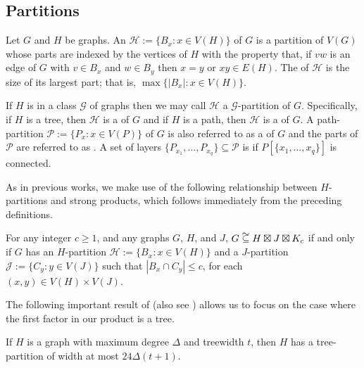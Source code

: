 \documentclass{patmorin}
\newcommand\subsetcong{\mathrel{\text{%
    \setbox0\hbox{$\subseteq$}%
    \rlap{\hbox to \wd0{\hss\hss\hss\raisebox{1.5\height}{$\sim$}\hss}}\box0
}}}
\renewcommand{\le}{\leqslant}
\renewcommand{\ge}{\geqslant}
\begin{document}
\subsection{Partitions}

Let $G$ and $H$ be graphs.  An  $\mathcal{H}:=\{B_x:x\in V(H)\}$ of $G$ is a partition of $V(G)$ whose parts are indexed by the vertices of $H$ with the property that, if $vw$ is an edge of $G$ with $v\in B_x$ and $w\in B_y$ then $x=y$ or $xy\in E(H)$.  The  of $\mathcal{H}$ is the size of its largest part; that is, $\max\{|B_x|:x\in V(H)\}$.

If $H$ is in a class $\mathcal{G}$ of graphs then we may call $\mathcal{H}$ a $\mathcal{G}$-partition of $G$.  Specifically, if $H$ is a tree, then $\mathcal{H}$ is a  of $G$ and if $H$ is a path, then $\mathcal{H}$ is a  of $G$.  A path-partition $\mathcal{P}:=\{P_x:x\in V(P)\}$ of $G$ is also referred to as a  of $G$ and the parts of $\mathcal{P}$ are referred to as .  A set of layers $\{P_{x_1},\ldots,P_{x_q}\}\subseteq\mathcal{P}$ is  if $P[\{x_1,\ldots,x_q\}]$ is connected.

As in previous works, we make use of the following relationship between $H$-partitions and strong products, which follows immediately from the preceding definitions.

\begin{obs}\label{partitions_vs_products}
  For any integer $c\ge 1$, and any graphs $G$, $H$, and $J$,  $G\subsetcong H\boxtimes J\boxtimes K_c$ if and only if $G$ has an $H$-partition $\mathcal{H}:=\{B_x:x\in V(H)\}$ and a $J$-partition $\mathcal{J}:=\{C_y:y\in V(J)\}$ such that $|B_x\cap C_y|\le c$, for each $(x,y)\in V(H)\times V(J)$.
\end{obs}

The following important result of \citet{ding.oporowski:some} (also see \cite{wood:on,distel.wood:tree_partitions}) allows us to focus on the case where the first factor in our product is a tree.

\begin{thm}\label{dingy}
  If $H$ is a graph with maximum degree $\Delta$ and treewidth $t$,
  then $H$ has a tree-partition of width at most $24\Delta(t+1)$.
\end{thm}
\end{document}
